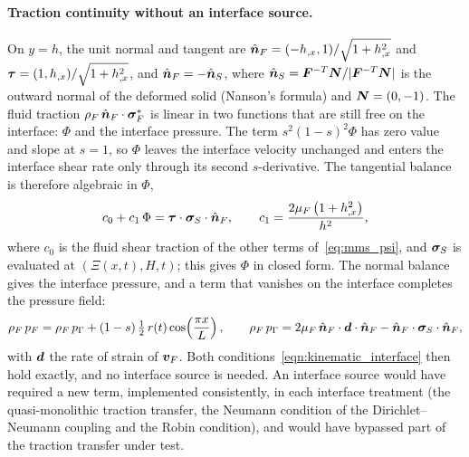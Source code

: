 \paragraph{Traction continuity without an interface source.}
On $y = h$, the unit normal and tangent are $\hat{\boldsymbol{n}}_F = (-h_{,x}, 1)/\sqrt{1 + h_{,x}^2}$ and $\boldsymbol{\tau} = (1, h_{,x})/\sqrt{1 + h_{,x}^2}$, and $\hat{\boldsymbol{n}}_F = -\hat{\boldsymbol{n}}_S$, where $\hat{\boldsymbol{n}}_S = \boldsymbol{F}^{-T}\boldsymbol{N}/|\boldsymbol{F}^{-T}\boldsymbol{N}|$ is the outward normal of the deformed solid (Nanson's formula) and $\boldsymbol{N} = (0,-1)$.
The fluid traction $\rho_F\,\hat{\boldsymbol{n}}_F\cdot\boldsymbol{\sigma}_F^*$ is linear in two functions that are still free on the interface: $\Phi$ and the interface pressure.
The term $s^2(1-s)^2\Phi$ has zero value and slope at $s = 1$, so $\Phi$ leaves the interface velocity unchanged and enters the interface shear rate only through its second $s$-derivative.
The tangential balance is therefore algebraic in $\Phi$,
\begin{equation}
	c_0 + c_1\,\Phi = \boldsymbol{\tau}\cdot\boldsymbol{\sigma}_S\cdot\hat{\boldsymbol{n}}_F,
	\qquad c_1 = \frac{2\mu_F\left(1 + h_{,x}^2\right)}{h^2},
	\label{eq:mms_Phi}
\end{equation}
where $c_0$ is the fluid shear traction of the other terms of~\eqref{eq:mms_psi}, and $\boldsymbol{\sigma}_S$ is evaluated at $(\Xi(x,t), H, t)$; this gives $\Phi$ in closed form.
The normal balance gives the interface pressure, and a term that vanishes on the interface completes the pressure field:
\begin{equation}
	\rho_F\,p_F = \rho_F\,p_\Gamma + (1 - s)\,\tfrac{1}{2}\,r(t)\cos\!\left(\frac{\pi x}{L}\right), \qquad
	\rho_F\,p_\Gamma = 2\mu_F\,\hat{\boldsymbol{n}}_F\cdot\boldsymbol{d}\cdot\hat{\boldsymbol{n}}_F - \hat{\boldsymbol{n}}_F\cdot\boldsymbol{\sigma}_S\cdot\hat{\boldsymbol{n}}_F,
	\label{eq:mms_p}
\end{equation}
with $\boldsymbol{d}$ the rate of strain of $\boldsymbol{v}_F$.
Both conditions~\eqref{eqn:kinematic_interface} then hold exactly, and no interface source is needed.
An interface source would have required a new term, implemented consistently, in each interface treatment (the quasi-monolithic traction transfer, the Neumann condition of the Dirichlet--Neumann coupling and the Robin condition), and would have bypassed part of the traction transfer under test.

